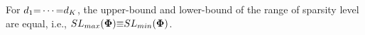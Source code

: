 \begin{remark}
For $d_1 {=} \cdots {=} d_K$, the upper-bound and lower-bound of the range of sparsity level are equal, i.e., $SL_{max}(\boldsymbol{\Phi}) {\equiv} SL_{min}(\boldsymbol{\Phi})$.
\end{remark}
